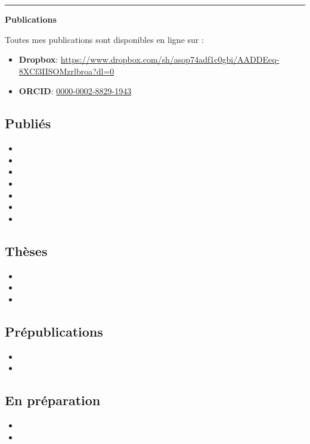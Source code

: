 \documentclass[a4paper]{article}
\newcommand{\block}[1]{\hrule \vspace{0.2cm} \textbf{\Large #1} \vspace{0.2cm}}
\begin{document}
	{\block{Publications}

	Toutes mes publications sont disponibles en ligne sur :
	\begin{itemize}[leftmargin=*, itemsep=0pt, parsep=0pt, topsep=0pt, partopsep=0pt]
		\item[$\cdot$] \textbf{Dropbox}: \url{https://www.dropbox.com/sh/asop74adf1c0gbi/AADDEeq-8XCf3IISOMzrlbroa?dl=0}
		\item[$\cdot$] \textbf{ORCID}: \href{https://orcid.org/0000-0002-8829-1943}{0000-0002-8829-1943}
	\end{itemize}

	\subsection*{Publiés}
\begin{itemize}
\item {}
\item {}
\item {}
\item {}
\item {}
\item {}
\item {}
\end{itemize}
\subsection*{Thèses}
\begin{itemize}
\item {}
\item {}
\item {}
\end{itemize}
\subsection*{Prépublications}
\begin{itemize}
\item {}
\item {}
\end{itemize}
\subsection*{En préparation}
\begin{itemize}
\item {}
\item {}
\end{itemize}	}
\end{document}
